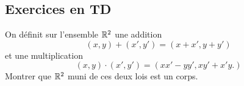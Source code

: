 \subsection*{Exercices en TD}\label{sec:tutorial_4}

\begin{td-exo} %
    On définit sur l'ensemble \(\mathbb{R}^2\) une addition
    \begin{equation*}
        (x,y) + (x',y') = (x+x',y+y')
    \end{equation*}
    et une multiplication
    \begin{equation*}
        (x,y) \cdot (x',y') = (xx'-yy',xy'+x'y.)
    \end{equation*}
    Montrer que \(\mathbb{R}^2\) muni de ces deux lois est un corps.
\end{td-exo}

